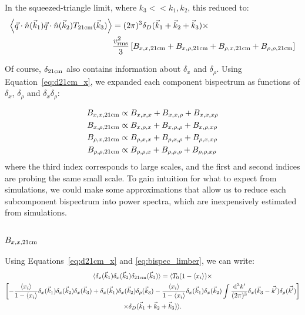 In the squeezed-triangle limit, where $k_3 << k_1,k_2$, this reduced to:
\begin{equation}
\begin{split}
\left\langle \vec{q} \cdot \hat{n}(\vec{k}_1) \vec{q} \cdot \hat{n} (\vec{k}_2) T_{{\rm 21cm}}(\vec{k}_3) \right\rangle &= 
(2\pi)^3 \delta_D(\vec{k}_1 + \vec{k}_2 + \vec{k}_3) \times \\
& \frac{v_{\rm rms}^2}{3} 
\left[ B_{x,x,{\rm 21cm}} + B_{x,\rho,{\rm 21cm}} + B_{\rho,x,{\rm 21cm}} +B_{\rho,\rho,{\rm 21cm}} \right]
\end{split}
\label{eq:component_bispectra}
\end{equation}

Of course, $\delta_{\rm 21cm}$ also contains information about $\delta_x$ and $\delta_{\rho}$. Using Equation~\ref{eq:d21cm_x}, we expanded each component bispectrum as functions of $\delta_x$, $\delta_{\rho}$ and $\delta_x\delta_{\rho}$:

\begin{equation}
\begin{split}
B_{x,x,{\rm 21cm}} &\propto B_{x,x,x} + B_{x,x,\rho} + B_{x,x,x\rho}\\
B_{x,\rho,{\rm 21cm}} &\propto B_{x,\rho,x} + B_{x,\rho,\rho} + B_{x,\rho,x\rho}\\
B_{\rho,x,{\rm 21cm}} &\propto B_{\rho,x,x} + B_{\rho,x,\rho} + B_{\rho,x,x\rho}\\
B_{\rho,\rho,{\rm 21cm}} &\propto B_{\rho,\rho,x} + B_{\rho,\rho,\rho} + B_{\rho,\rho,x\rho}\\
\end{split}
\label{eq:lots_of_bispectra}
\end{equation}
where the third index corresponds to large scales, and the first and second indices are probing the same small scale. To gain intuition for what to expect from simulations, we could make some approximations that allow us to reduce each subcomponent bispectrum into power spectra, which are inexpensively estimated from simulations.

\subsubsection{$B_{x,x,\rm 21cm}$}
\label{subsec:B_xx21}
Using Equations~\ref{eq:d21cm_x} and \ref{eq:bispec_limber}, we can write:
\begin{multline}
\langle \delta_x(\vec{k}_1) \delta_x(\vec{k}_2) \delta_{{\rm 21cm}}(\vec{k}_3) \rangle = 
\langle
T_0(1- \left\langle x_i \right\rangle ) \times \\
\left[
- \frac{\left\langle x_i \right\rangle}{1 - \left\langle x_i \right\rangle} \delta_x(\vec{k}_1) \delta_x(\vec{k}_2) \delta_x(\vec{k}_3) + \delta_x(\vec{k}_1) \delta_x(\vec{k}_2) \delta_{\rho}(\vec{k}_3) 
 - \frac{\left\langle x_i \right\rangle}{1 - \left\langle x_i \right\rangle} \delta_x(\vec{k}_1) \delta_x(\vec{k}_2) \int \frac{{\rm d^3}k'}{(2\pi)^3} \delta_x(\vec{k}_3 - \vec{k'})\delta_{\rho}(\vec{k'})
\right] \\
\times \delta_D(\vec{k}_1+\vec{k}_2+\vec{k}_3) 
\rangle .
\label{eq:B_xx21}
\end{multline}

